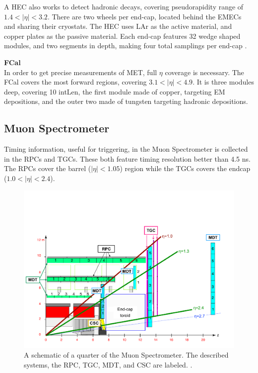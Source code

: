 A \gls{HEC} also works to detect hadronic decays, covering pseudorapidity range of $1.4 < |\eta| < 3.2$. There are two wheels per end-cap, located behind the \glspl{EMEC} and sharing their cryostats. The \gls{HEC} uses \gls{LAr} as the active material, and copper plates as the passive material. Each end-cap features 32 wedge shaped modules, and two segments in depth, making four total samplings per end-cap \cite{lar-tdr}.


\noindent\textbf{\gls{FCal}}\\
\indent In order to get precise measurements of \gls{MET}, full $\eta$ coverage is necessary. The \gls{FCal} covers the most forward regions, covering $3.1 < |\eta| < 4.9$. It is three modules deep, covering 10 \gls{intLen}, the first module made of copper, targeting \gls{EM} depositions, and the outer two made of tungsten targeting hadronic depositions.


\subsection{Muon Spectrometer} \label{ssec:muonspectrometer}

Timing information, useful for triggering, in the Muon Spectrometer is collected in the \glspl{RPC} and \glspl{TGC}. These both feature timing resolution better than 4.5 ns. The \glspl{RPC} cover the barrel ($|\eta| < 1.05$) region while the \glspl{TGC} covers the endcap ($1.0<|\eta|<2.4$).

\begin{figure}[!ht]
    \centering
    \includegraphics[width=.9\textwidth]{chapters/chapter2_experiment/images/muon_detector.png}
    \caption{A schematic of a quarter of the Muon Spectrometer. The described systems, the \gls{RPC}, \gls{TGC}, \gls{MDT}, and \gls{CSC} are labeled. \cite{muon-performance2015}.}
    \label{fig:muon-schematic}
\end{figure}


